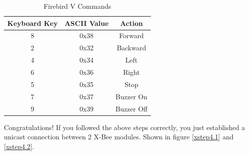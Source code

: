 \begin{flushleft}
\begin{table}[h]
\begin{center}
\begin{tabular}{|c|c|c|}

\hline Keyboard Key & ASCII Value & Action \\ 
\hline 8 &  0x38 & Forward \\ 
\hline 2 &  0x32 & Backward \\ 
\hline 4 &  0x34 & Left \\ 
\hline 6 &  0x36 & Right \\ 
\hline 5 &  0x35 & Stop \\ 
\hline 7 &  0x37 & Buzzer On \\ 
\hline 9 &  0x39 & Buzzer Off\\  
\hline
\end{tabular}
\end{center}
\caption{Firebird V Commands}
\label{fbcommands}
\end{table}

\medskip

Congratulations! If you followed the above steps correctly, you just established a unicast connection between 2 X-Bee modules.
Shown in figure \ref{xstep4.1} and \ref{xstep4.2}.

\end{flushleft}
